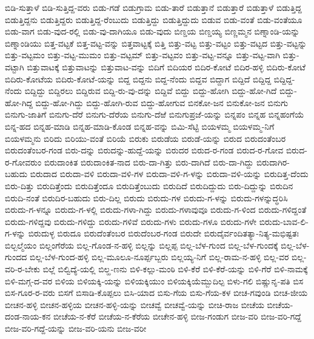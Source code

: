 ಬಿಡಿ-ಸುತ್ತಾಳೆ
ಬಿಡಿ-ಸುತ್ತಿದ್ದ-ವರು
ಬಿಡು-ಗಡೆ
ಬಿಡುಗ್ರಾಮ
ಬಿಡು-ತಾರೆ
ಬಿಡುತ್ತಾನೆ
ಬಿಡುತ್ತಾರೆ
ಬಿಡುತ್ತಾಳೆ
ಬಿಡುತ್ತಿದ್ದ
ಬಿಡುತ್ತಿದ್ದನು
ಬಿಡುತ್ತಿದ್ದರು
ಬಿಡುತ್ತಿದ್ದ-ರೆಂಬುದು
ಬಿಡುತ್ತಿದ್ದು
ಬಿಡುತ್ತಿದ್ದುದು
ಬಿಡುವ
ಬಿಡು-ವಂತೆ
ಬಿಡು-ವಂತೆಯೂ
ಬಿಡು-ವಾಗ
ಬಿಡು-ವುದ-ರಲ್ಲಿ
ಬಿಡು-ವು-ದಾಗಿಯೂ
ಬಿಡು-ವುದು
ಬಿಣ್ಡಯ
ಬಿಣ್ಡಯ್ಯ
ಬಿಣ್ಣಮ್ಮನ
ಬಿಣ್ನಾಂಡಿ-ಯನ್ನು
ಬಿಣ್ನಾಂಡಿಯು
ಬಿತ್ತ-ವಟ್ಟಕೆ
ಬಿತ್ತ-ವಟ್ಟ-ವನ್ನು
ಬಿತ್ತವಾಟ್ಟಕ್ಕೆ
ಬಿತ್ತಿ
ಬಿತ್ತು-ವಟ್ಟ
ಬಿತ್ತು-ವಟ್ಟಂ
ಬಿತ್ತು-ವಟ್ಟದ
ಬಿತ್ತು-ವಟ್ಟನ್ನು
ಬಿತ್ತು-ವಟ್ಟಮಂ
ಬಿತ್ತು-ವಟ್ಟ-ಮುಮಂ
ಬಿತ್ತು-ವಟ್ಟಮ್
ಬಿತ್ತು-ವಟ್ಟವಂ
ಬಿತ್ತು-ವಟ್ಟ-ವನ್ನೂ
ಬಿತ್ತು-ವಟ್ಟ-ವಾಗಿ
ಬಿತ್ತು-ವಟ್ಟಾಗಿ
ಬಿತ್ತುವಾಟಕ್ಕೆ
ಬಿತ್ತುವಾಟನ್ನು
ಬಿತ್ತುವಾಟ-ವನ್ನು
ಬಿದಿಗೆ
ಬಿದಿಯರ
ಬಿದಿರ-ಕೋಟೆ
ಬಿದಿರ-ಹಳ್ಳಿ
ಬಿದಿರು-ಕೋಟೆ
ಬಿದಿರು-ಕೋಟೆಯ
ಬಿದಿರು-ಕೋಟೆ-ಯನ್ನು
ಬಿದ್ದ
ಬಿದ್ದನು
ಬಿದ್ದ-ನೆಂದು
ಬಿದ್ದವ
ಬಿದ್ದಾಗ
ಬಿದ್ದಿದೆ
ಬಿದ್ದಿದ್ದ
ಬಿದ್ದಿದ್ದ-ನೆಂದು
ಬಿದ್ದಿದ್ದು
ಬಿದ್ದಿರಲು
ಬಿದ್ದಿರುವ
ಬಿದ್ದಿ-ರು-ವು-ದನ್ನು
ಬಿದ್ದಿವೆ
ಬಿದ್ದು
ಬಿದ್ದು-ಹೋಗಿ
ಬಿದ್ದು-ಹೋ-ಗಿದೆ
ಬಿದ್ದು-ಹೋ-ಗಿದ್ದ
ಬಿದ್ದು-ಹೋ-ಗಿದ್ದು
ಬಿದ್ದು-ಹೋಗಿ-ರುವ
ಬಿದ್ದು-ಹೋಗುವ
ಬಿನಕೋ-ಜನ
ಬಿನುಕೋ-ಜನ
ಬಿನುಗು
ಬಿನುಗು-ಜಾತಿಗೆ
ಬಿನುಗು-ದೆರೆ
ಬಿನುಗು-ದೆರೆಯ
ಬಿನುಗು-ದೆಱೆ
ಬಿನುಗುಪ್ರಜೆ-ಯನ್ನು
ಬಿನ್ನಪಂ
ಬಿನ್ನಹ
ಬಿನ್ನಹಂಗೆಯೆ
ಬಿನ್ನ-ಹದ
ಬಿನ್ನಹ-ಮಾಡಿ
ಬಿನ್ನಹ-ಮಾಡಿ-ಕೊಂಡ
ಬಿನ್ನಹ-ವನ್ನು
ಬಿಮಿ-ಸೆಟ್ಟಿ
ಬಿಯಳಮ್ಮ
ಬಿಯಳಮ್ಮ-ನಿಗೆ
ಬಿಯಳಮ್ಮನು
ಬಿರಿದು
ಬಿರಿಯು-ವಂತೆ
ಬಿರಿಯೆ
ಬಿರುಕು
ಬಿರುಡೆಯ
ಬಿರುಡೆ-ಯನ್ನು
ಬಿರುದ
ಬಿರುದಂತೆಂಬರ
ಬಿರುದಂತೆಂಬರ-ಗಂಡ
ಬಿರು-ದನ್ನು
ಬಿರುದನ್ನು-ಹುದ್ದೆ-ಯನ್ನು
ಬಿರುದರ
ಬಿರುದ-ರ-ಗಂಡ
ಬಿರುದ-ರ-ಗೋವ
ಬಿರುದ-ರ-ಗೋವರುಂ
ಬಿರುದಾಂಕಿತ
ಬಿರುದಾಂಕಿತ-ನಾದ
ಬಿರು-ದಾ-ಗಿತ್ತು
ಬಿರು-ದಾಗಿದೆ
ಬಿರು-ದಾ-ಗಿದ್ದು
ಬಿರುದಾಗಿರ-ಬಹುದು
ಬಿರುದಾದ
ಬಿರುದಾ-ವಳಿ
ಬಿರುದಾ-ವಳಿ-ಗಳ
ಬಿರುದಾ-ವಳಿ-ಗ-ಳನ್ನು
ಬಿರುದಾ-ವಳಿ-ಯನ್ನು
ಬಿರುದಿತ್ತ-ದೆಂದು
ಬಿರು-ದಿತ್ತು
ಬಿರುದಿತ್ತೆಂದು
ಬಿರುದಿತ್ತೆಂದೂ
ಬಿರುದಿತ್ತೆಂಬುದು
ಬಿರುದಿದೆ
ಬಿರುದಿದ್ದುದು
ಬಿರು-ದಿದ್ದುನ್ನು
ಬಿರುದಿನ
ಬಿರುದಿ-ನಂತೆ
ಬಿರುದಿರ-ಬಹುದು
ಬಿರು-ದಿಲ್ಲ
ಬಿರುದು
ಬಿರುದು-ಗಳ
ಬಿರುದು-ಗ-ಳನ್ನು
ಬಿರುದು-ಗಳನ್ನುದ್ಧರಿಸಿ
ಬಿರುದು-ಗ-ಳನ್ನೂ
ಬಿರುದು-ಗ-ಳಲ್ಲಿ
ಬಿರುದು-ಗಳಾ-ಗಿದ್ದು
ಬಿರುದು-ಗಳಾವುವೂ
ಬಿರುದು-ಗ-ಳಿಂದ
ಬಿರುದು-ಗಳಿದ್ದಂತೆ
ಬಿರುದು-ಗಳಿದ್ದವು
ಬಿರುದು-ಗಳಿದ್ದು
ಬಿರುದು-ಗಳಿವೆ
ಬಿರುದು-ಗಳು
ಬಿರುದು-ಗಳೂ
ಬಿರುದು-ಗಳೇ
ಬಿರುದು-ಬಾವ-ಲಿ-ಗ-ಳನ್ನು
ಬಿರುದುಳ್ಳ
ಬಿರುದೂ
ಬಿರುದೆಂತೆಂಬರ
ಬಿರುದೆಂಬರ-ಗಂಡ
ಬಿರುದೇ
ಬಿರುದೈರ್ವಂದಿತತ್ಯಾ-ನಿತ್ಯ-ಮಭಿಷ್ಟತಃ
ಬಿಲ್ಬಲ್ಮೆಯಂ
ಬಿಲ್ಲಂಗೆರೆಯ
ಬಿಲ್ಲ-ಗೊಂಡ-ನ-ಹಳ್ಳಿ
ಬಿಲ್ಲನ್ನು
ಬಿಲ್ಲಪ್ಪ
ಬಿಲ್ಲ-ಬೆಳ-ಗುಂದ
ಬಿಲ್ಲ-ಬೆಳ-ಗುಂದಕ್ಕೆ
ಬಿಲ್ಲ-ಬೆಳ-ಗುಂದದ
ಬಿಲ್ಲ-ಬೆಳ-ಗುಂದ-ಹಳ್ಳಿ
ಬಿಲ್ಲ-ಮೂಲೂ-ನೂರ್ಪ್ಪಬ್ಬರು
ಬಿಲ್ಲಯ್ಯ-ನಿಗೆ
ಬಿಲ್ಲ-ರಾಮ-ನ-ಹಳ್ಳಿ
ಬಿಲ್ಲ-ವರ
ಬಿಲ್ಲ-ವರಿ-ರ-ಬೇಕು
ಬಿಲ್ಲೆ
ಬಿಲ್ವಿದ್ಯೆ-ಯಲ್ಲಿ
ಬಿಲ್ಹ-ಣನು
ಬಿಳಿ-ಕಲ್ಲು-ಮಂಠಿ
ಬಿಳಿ-ಕೆರೆ
ಬಿಳಿ-ಕೆರೆ-ಯನ್ನು
ಬಿಳಿ-ಗೆರೆ
ಬಿಳಿ-ನಾಮಕ್ಕೆ
ಬಿಳಿ-ಮಗ್ಗ-ದ-ವರ
ಬಿಳಿಯ
ಬಿಳಿಯಕ್ಕಿ-ಯನ್ನು
ಬಿಳಿಯಕ್ಕಿಯುಂ
ಬಿಳಿಯಕ್ಕಿಯೆಮ್ಬುದಿಲ್ಪ
ಬಿಳು-ಗಲಿ
ಬಿಷ್ಣುನೃ-ಪತಿ
ಬಿಸ
ಬಿಸ-ಗೂರ-ರ-ವರು
ಬಿಸಗೆ
ಬಿಸಾಡಿ-ಕೊಪ್ಪಲು
ಬಿಸಿ-ಯಾದ
ಬಿಸು-ಗೆಯ
ಬಿಸು-ಗೆಯ-ಕಳ
ಬೀಚ-ಗವುಂಡಿ
ಬೀಚ-ಜೀಯ
ಬೀಚನ-ಹಳ್ಳಿ
ಬೀಚನ-ಹಳ್ಳಿಯ
ಬೀಚನ-ಹಳ್ಳಿ-ಯನ್ನು
ಬೀಚವ್ವೆ
ಬೀಚವ್ವೆ-ಯನ್ನು
ಬೀಚಿ-ರಾಜ
ಬೀಚೆಯ
ಬೀಚೆಯ-ದಂಡ-ನಾಯ-ಕನ
ಬೀಚೆಯ-ನ-ಕೆರೆ
ಬೀಚೆಯ-ನ-ಕೆರೆಯ
ಬೀಚೇನ-ಹಳ್ಳಿ
ಬೀಜ-ಗಂಡುಗ
ಬೀಜ-ವರಿ
ಬೀಜ-ವರಿ-ಗದ್ದೆ
ಬೀಜ-ವರಿ-ಗದ್ದೆ-ಯನ್ನು
ಬೀಜ-ವರಿ-ಯನು
ಬೀಜ-ವರೀ

